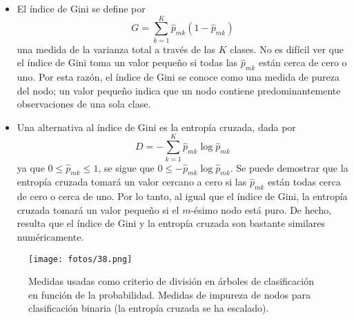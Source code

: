 \begin{itemize}
\item El índice de Gini se define por
\begin{equation}
G = \sum_{k=1}^{K} \hat{p}_{mk}(1 - \hat{p}_{mk})
\end{equation}
una medida de la varianza total a través de las $K$ clases. No es difícil ver que el índice de Gini toma un valor pequeño si todas las $\hat{p}_{mk}$ están cerca de cero o uno. Por esta razón, el índice de Gini se conoce como una medida de pureza del nodo; un valor pequeño indica que un nodo contiene predominantemente observaciones de una sola clase.
\item Una alternativa al índice de Gini es la entropía cruzada, dada por 
\begin{equation}
D = -\sum_{k=1}^{K} \hat{p}_{mk} \log \hat{p}_{mk}
\end{equation}
ya que $0 \leq \hat{p}_{mk} \leq 1$, se sigue que $0 \leq -\hat{p}_{mk} \log \hat{p}_{mk}$. Se puede demostrar que
la entropía cruzada tomará un valor cercano a cero si las $\hat{p}_{mk}$ están todas cerca de cero o cerca de uno. Por lo tanto, al igual que el índice de Gini, la entropía cruzada tomará un valor pequeño si el $m$-ésimo nodo está puro. De hecho, resulta que el índice de Gini y la entropía cruzada son bastante similares numéricamente.
\end{itemize}

\begin{figure}[h]
\centering
\texttt{[image: fotos/38.png]}
\caption{Medidas usadas como criterio de división en árboles de clasificación en función de la probabilidad. Medidas de impureza de nodos para clasificación binaria (la entropía cruzada se ha escalado).}
\label{fig:6.66}
\end{figure}

